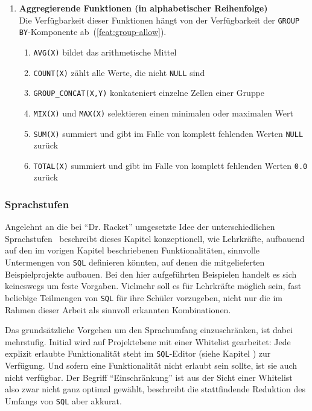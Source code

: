 \begin{enumerate}[resume]
\item \textbf{Aggregierende Funktionen (in alphabetischer Reihenfolge)} \\
  Die Verfügbarkeit dieser Funktionen hängt von der Verfügbarkeit der \texttt{GROUP BY}-Komponente ab~(\ref{feat:group-allow}).
  \begin{enumerate}[noitemsep]
  \item \label{feat:fun-avg} \texttt{AVG(X)} bildet das arithmetische Mittel
  \item \label{feat:fun-count} \texttt{COUNT(X)} zählt alle Werte, die nicht \texttt{NULL} sind
  \item \label{feat:fun-group-concat} \texttt{GROUP\_CONCAT(X,Y)} konkateniert einzelne Zellen einer Gruppe
  \item \label{feat:fun-max-min} \texttt{MIX(X)} und \texttt{MAX(X)} selektieren einen minimalen oder maximalen Wert
  \item \label{feat:fun-sum} \texttt{SUM(X)} summiert und gibt im Falle von komplett fehlenden Werten \texttt{NULL} zurück
  \item \label{feat:fun-total} \texttt{TOTAL(X)} summiert und gibt im Falle von komplett fehlenden Werten \texttt{0.0} zurück
  \end{enumerate}
\end{enumerate}

\subsubsection{Sprachstufen}
\label{sec:sql-subset-ranks}

Angelehnt an die bei "`Dr. Racket"' umgesetzte Idee der unterschiedlichen Sprachstufen~\cite{macht-der-abstraktion} beschreibt dieses Kapitel konzeptionell, wie Lehrkräfte, aufbauend auf den im vorigen Kapitel beschriebenen Funktionalitäten, sinnvolle Untermengen von \texttt{SQL} definieren könnten, auf denen die mitgelieferten Beispielprojekte aufbauen. Bei den hier aufgeführten Beispielen handelt es sich keineswegs um feste Vorgaben. Vielmehr soll es für Lehrkräfte möglich sein, fast beliebige Teilmengen von \texttt{SQL} für ihre Schüler vorzugeben, nicht nur die im Rahmen dieser Arbeit als sinnvoll erkannten Kombinationen.

Das grundsätzliche Vorgehen um den Sprachumfang einzuschränken, ist dabei mehrstufig. Initial wird auf Projektebene mit einer Whitelist gearbeitet: Jede explizit erlaubte Funktionalität steht im \texttt{SQL}-Editor (siehe Kapitel ) zur Verfügung. Und sofern eine Funktionalität nicht erlaubt sein sollte, ist sie auch nicht verfügbar. Der Begriff "`Einschränkung"' ist aus der Sicht einer Whitelist also zwar nicht ganz optimal gewählt, beschreibt die stattfindende Reduktion des Umfangs von \texttt{SQL} aber akkurat.

